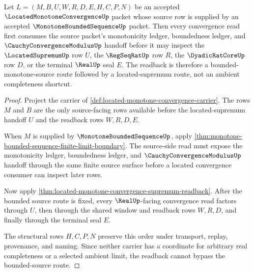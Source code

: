 \begin{theorem}
\label{thm:located-monotone-convergence-bounded-source-route}
Let $L=(M,B,U,W,R,D,E,H,C,P,N)$ be an accepted $\LocatedMonotoneConvergenceUp$ packet whose source row is supplied by an accepted $\MonotoneBoundedSequenceUp$ packet. Then every convergence read first consumes the source packet's monotonicity ledger, boundedness ledger, and $\CauchyConvergenceModulusUp$ handoff before it may inspect the $\LocatedSupremumUp$ row $U$, the $\RegSeqRatUp$ row $R$, the $\DyadicRatCoreUp$ row $D$, or the terminal $\RealUp$ seal $E$. The readback is therefore a bounded-monotone-source route followed by a located-supremum route, not an ambient completeness shortcut.
\end{theorem}
\begin{proof}
Project the carrier of \autoref{def:located-monotone-convergence-carrier}. The rows $M$ and $B$ are the only source-facing rows available before the located-supremum handoff $U$ and the readback rows $W,R,D,E$.

When $M$ is supplied by $\MonotoneBoundedSequenceUp$, apply \autoref{thm:monotone-bounded-sequence-finite-limit-boundary}. The source-side read must expose the monotonicity ledger, boundedness ledger, and $\CauchyConvergenceModulusUp$ handoff through the same finite source surface before a located convergence consumer can inspect later rows.

Now apply \autoref{thm:located-monotone-convergence-supremum-readback}. After the bounded source route is fixed, every $\RealUp$-facing convergence read factors through $U$, then through the shared window and readback rows $W,R,D$, and finally through the terminal seal $E$.

The structural rows $H,C,P,N$ preserve this order under transport, replay, provenance, and naming. Since neither carrier has a coordinate for arbitrary real completeness or a selected ambient limit, the readback cannot bypass the bounded-source route.
\end{proof}

